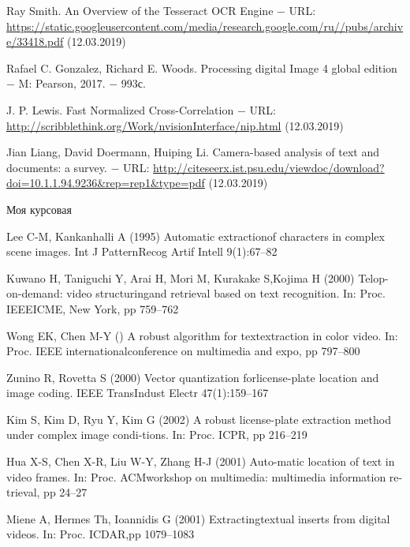 \documentclass[oneside,final,14pt]{extreport}
\newcommand{\urlTitle}{ $-$ URL: }
\begin{document}
\newpage
\begin{thebibliography}{0}

﻿Ray Smith. An Overview of the Tesseract OCR Engine \urlTitle
\url{https://static.googleusercontent.com/media/research.google.com/ru//pubs/archive/33418.pdf} (12.03.2019)

 Rafael C. Gonzalez, Richard E. Woods. Processing digital Image 4 global edition $-$ M: Pearson, 2017. $-$ 993с. 

J. P. Lewis. Fast Normalized Cross-Correlation 
\urlTitle \url{http://scribblethink.org/Work/nvisionInterface/nip.html} (12.03.2019)

﻿Jian Liang, David Doermann, Huiping Li. Camera-based analysis of text and documents: a survey. \urlTitle \url{http://citeseerx.ist.psu.edu/viewdoc/download?doi=10.1.1.94.9236&rep=rep1&type=pdf} (12.03.2019)


 Моя курсовая

Lee C-M, Kankanhalli A (1995) Automatic extractionof characters in complex scene images. Int J PatternRecog Artif Intell 9(1):67–82

Kuwano H, Taniguchi Y, Arai H, Mori M, Kurakake S,Kojima H (2000) Telop-on-demand: video structuringand retrieval based on text recognition. In: Proc. IEEEICME, New York, pp 759–762

Wong EK, Chen M-Y () A robust algorithm for textextraction in color video. In: Proc. IEEE internationalconference on multimedia and expo, pp 797–800

 Zunino R, Rovetta S (2000) Vector quantization forlicense-plate location and image coding. IEEE TransIndust Electr 47(1):159–167

Kim S, Kim D, Ryu Y, Kim G (2002) A robust license-plate extraction method under complex image condi-tions. In: Proc. ICPR, pp 216–219

 Hua X-S, Chen X-R, Liu W-Y, Zhang H-J (2001) Auto-matic location of text in video frames. In: Proc. ACMworkshop on multimedia: multimedia information re-trieval, pp 24–27

Miene A, Hermes Th, Ioannidis G (2001) Extractingtextual inserts from digital videos. In: Proc. ICDAR,pp 1079–1083


\end{thebibliography}
\end{document}
